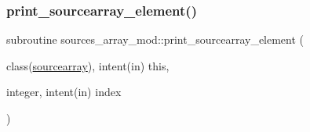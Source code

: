 \mbox{\label{namespacesources__array__mod_a83b399b5839262af19adcae73824874e}} 
\subsubsection{\texorpdfstring{print\+\_\+sourcearray\+\_\+element()}{print\_sourcearray\_element()}}
{\footnotesize\ttfamily subroutine sources\+\_\+array\+\_\+mod\+::print\+\_\+sourcearray\+\_\+element (\begin{DoxyParamCaption}\item[{class(\hyperlink{structsources__array__mod_1_1sourcearray}{sourcearray}), intent(in)}]{this,  }\item[{integer, intent(in)}]{index }\end{DoxyParamCaption})\hspace{0.3cm}{\ttfamily [private]}}

